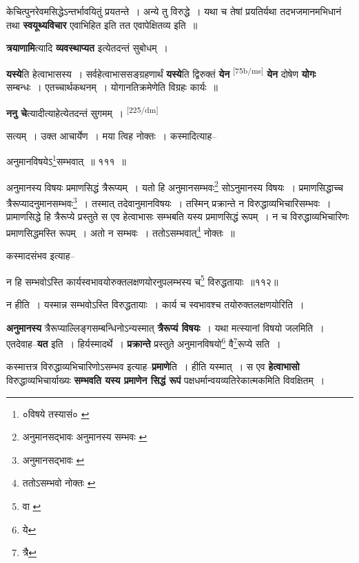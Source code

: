 \documentclass[article,12pt,a4paper]{memoir}
\begin{document}
	  \pstart केचित्पुनरेवमसिद्धेऽन्तर्भावयितुं प्रयतन्ते । अन्ये तु विरुद्धे । यथा च तेषां प्रयतिर्यथा तदभजमानमभिधानं तथा \textbf{स्वयूथ्यविचार} एवाभिहित इति तत एवापेक्षितव्य इति ॥
	\pend
      

	  \pstart \textbf{त्रयाणामि}त्यादि \textbf{व्यवस्थाप्यत} इत्येतदन्तं सुबोधम् ।
	\pend
      

	  \pstart \textbf{यस्ये}ति हेत्वाभासस्य । सर्वहेत्वाभाससङ्ग्रहणार्थं \textbf{यस्ये}ति द्विरुक्तं \textbf{येन} \leavevmode\textsuperscript{\rmlatinfont\tiny [75b/ms]} \textbf{येन} दोषेण \textbf{योगः} सम्बन्धः । एतच्चार्थकथनम् । योगानतिक्रमेणेति विग्रहः कार्यः ॥
	\pend
      

	  \pstart \textbf{ननु चे}त्यादीत्याहेत्येतदन्तं सुगमम् ।
	\pend
      \leavevmode\textsuperscript{\rmlatinfont\tiny [225/dm]}

	  \pstart सत्यम् । उक्त आचार्येण । मया त्विह नोक्तः । कस्मादित्याह--
	\pend
       

	  \pstart अनुमानविषयेऽ\footnote{०विषये तस्यासं० \cite{dp-msC}}सम्भवात् ॥ १११ ॥
	\pend
       

	  \pstart अनुमानस्य विषयः प्रमाणसिद्धं त्रैरूप्यम् । यतो हि अनुमानसम्भवः\footnote{अनुमानसद्भावः \cite{dp-msA} \cite{dp-msB} \cite{dp-msC} \cite{dp-edP} \cite{dp-edH} \cite{dp-edN} अनुमानस्य सम्भवः \cite{dp-edE}} सोऽनुमानस्य विषयः । प्रमाणसिद्धाच्च त्रैरूप्यादनुमानसम्भवः\footnote{अनुमानसद्भावः \cite{dp-msA} \cite{dp-msB} \cite{dp-edP} \cite{dp-edH} \cite{dp-edN}} । तस्मात् तदेवानुमानविषयः । तस्मिन् प्रक्रान्ते न विरुद्धाव्यभिचारिसम्भवः । प्रामाणसिद्धे हि त्रैरूप्ये प्रस्तुते स एव हेत्वाभासः सम्भबति यस्य प्रमाणसिद्धं रूपम् । न च विरुद्धाव्यभिचारिणः प्रमाणसिद्धमस्ति रूपम् । अतो न सम्भवः । ततोऽसम्भवात्\footnote{ततोऽसम्भवो नोक्तः \cite{dp-msA} \cite{dp-msB} \cite{dp-edP} \cite{dp-edH}} नोक्तः ॥
	\pend
       

	  \pstart कस्मादसंभव इत्याह--
	\pend
       

	  \pstart न हि सम्भवोऽस्ति कार्यस्वभावयोरुक्तलक्षणयोरनुपलम्भस्य च\footnote{वा \cite{dp-msD}} विरुद्धतायाः ॥११२॥
	\pend
       

	  \pstart न हीति । यस्मान्न सम्भवोऽस्ति विरुद्धतायाः । कार्य च स्वभावश्च तयोरुक्तलक्षणयोरिति ।
	\pend
      

	  \pstart \textbf{अनुमानस्य} त्रैरूप्याल्लिङ्गसम्बन्धिनोऽन्यस्मात् \textbf{त्रैरूप्यं विषयः} । यथा मत्स्यानां विषयो जलमिति । एतदेवाह--\textbf{यत} इति । हिर्यस्मादर्थे । \textbf{प्रक्रान्ते} प्रस्तुते अनुमानविषयो\footnote{ये} वै\footnote{त्रै}रूप्ये सति ।
	\pend
      

	  \pstart कस्मात्तत्र विरुद्धाव्यभिचारिणोऽसम्भव इत्याह--\textbf{प्रमाणे}ति । हीति यस्मात् । स एव \textbf{हेत्वाभासो} विरुद्धाव्यभिचार्याख्यः \textbf{सम्भवति यस्य प्रमाणेन सिद्धं रूपं} पक्षधर्मान्वयव्यतिरेकात्मकमिति विवक्षितम् ।
	\pend
      
\end{document}
